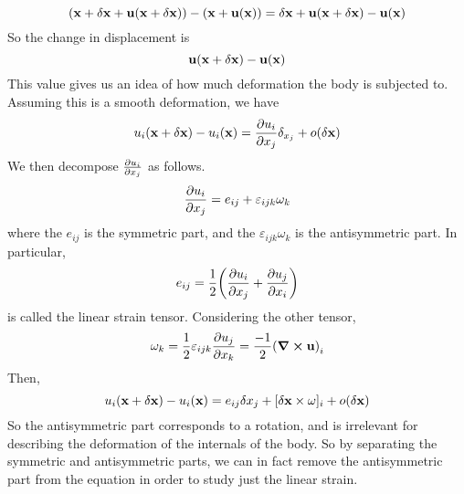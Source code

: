 \[ (\vb x + \delta \vb x + \vb u(\vb x + \delta\vb x)) - (\vb x + \vb u(\vb x)) = \delta \vb x + \vb u(\vb x + \delta\vb x) - \vb u(\vb x) \]
So the change in displacement is
\[ \vb u(\vb x + \delta\vb x) - \vb u(\vb x) \]
This value gives us an idea of how much deformation the body is subjected to. Assuming this is a smooth deformation, we have
\[ u_i(\vb x + \delta\vb x) - u_i(\vb x) = \pdv{u_i}{x_j}\delta_{x_j} + o(\delta \vb x) \]
We then decompose $\pdv{u_i}{x_j}$ as follows.
\[ \pdv{u_i}{x_j} = e_{ij} + \varepsilon_{ijk}\omega_k \]
where the $e_{ij}$ is the symmetric part, and the $\varepsilon_{ijk}\omega_k$ is the antisymmetric part. In particular,
\[ e_{ij} = \frac{1}{2}\qty(\pdv{u_i}{x_j} + \pdv{u_j}{x_i}) \]
is called the linear strain tensor. Considering the other tensor,
\[ \omega_k = \frac{1}{2}\varepsilon_{ijk}\pdv{u_j}{x_k} = \frac{-1}{2}\qty(\curl{\vb u})_i \]
Then,
\[ u_i(\vb x + \delta \vb x) - u_i(\vb x) = e_{ij} \delta x_j + [\delta \vb x \times \vb \omega]_i + o(\delta \vb x) \]
So the antisymmetric part corresponds to a rotation, and is irrelevant for describing the deformation of the internals of the body. So by separating the symmetric and antisymmetric parts, we can in fact remove the antisymmetric part from the equation in order to study just the linear strain.

